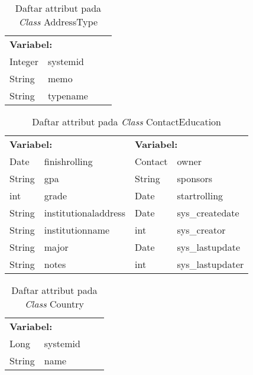 \begin{table}[H]
	\caption{Daftar attribut pada \textit{Class} AddressType}
	\centering
	\small
	\begin{adjustbox}{width=1\textwidth}	
		\begin{tabular}{|p{4cm} p{2.1cm} p{3cm} p{3.1cm}|}
			\hline
			\multicolumn{2}{|l}{\textbf{Variabel:}}&\multicolumn{2}{l|}{\textbf{}}\\
			Integer&systemid&&\\
			String&memo&&\\
			String&typename&&\\
			\hline
		\end{tabular}
	\end{adjustbox}
\end{table}
\begin{table}[H]
	\caption{Daftar attribut pada \textit{Class} ContactEducation}
	\centering
	\small
	\begin{adjustbox}{width=1\textwidth}	
		\begin{tabular}{|p{3cm} p{3.1cm} p{3cm} p{3.1cm}|}
			\hline
			\multicolumn{2}{|l}{\textbf{Variabel:}}&\multicolumn{2}{l|}{\textbf{\textbf{Variabel:}}}\\
			Date&finishrolling&Contact&owner\\
			String&gpa&String&sponsors\\
			int&grade&Date&startrolling\\
			String&institutionaladdress&Date&sys\_createdate\\
			String&institutionname&int&sys\_creator\\
			String&major&Date&sys\_lastupdate\\
			String&notes&int&sys\_lastupdater\\
			\hline
		\end{tabular}
	\end{adjustbox}
\end{table}
\begin{table}[H]
	\caption{Daftar attribut pada \textit{Class} Country}
	\centering
	\small
	\begin{adjustbox}{width=1\textwidth}	
		\begin{tabular}{|p{4cm} p{2.1cm} p{3cm} p{3.1cm}|}
			\hline
			\multicolumn{2}{|l}{\textbf{Variabel:}}&\multicolumn{2}{l|}{\textbf{}}\\
			Long&systemid&&\\
			String&name&&\\
			\hline
		\end{tabular}
	\end{adjustbox}
\end{table}
